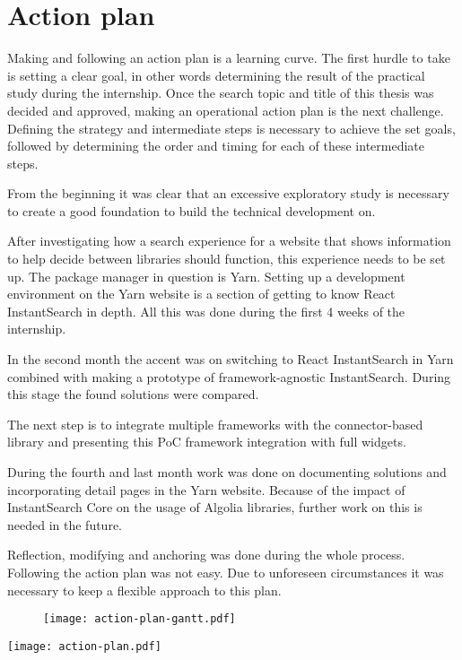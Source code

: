 
\chapter{Action plan}
\label{chp:action_plan}

Making and following an action plan is a learning curve. The first hurdle to take is setting a clear goal, in other words determining the result of the practical study during the internship.  Once the search topic and title of this thesis was decided and approved, making an operational action plan is the next challenge. Defining the strategy and intermediate steps is necessary to achieve the set goals, followed by determining the order and timing for each of these intermediate steps.

From the beginning it was clear that an excessive exploratory study is necessary to create a good foundation to build the technical development on. 

After investigating how a search experience for a website that shows information to help decide between libraries should function, this experience needs to be set up. The package manager in question is Yarn. Setting up a development environment on the Yarn website is a section of getting to know React InstantSearch in depth. All this was done during the first 4 weeks of the internship.

In the second month the accent was on switching to React InstantSearch in Yarn combined with making a prototype of framework-agnostic InstantSearch. During this stage the found solutions were compared. 

The next step is to integrate multiple frameworks with the connector-based library and presenting this PoC framework integration with full widgets.

During the fourth and last month work was done on documenting solutions and incorporating detail pages in the Yarn website. Because of the impact of InstantSearch Core on the usage of Algolia libraries, further work on this is needed in the future.

Reflection, modifying and anchoring was done during the whole process. Following the action plan was not easy. Due to unforeseen circumstances it was necessary to keep a flexible approach to this plan.

\begin{figure}
  \centering
  \texttt{[image: action-plan-gantt.pdf]}
\end{figure}

\newpage

\texttt{[image: action-plan.pdf]}
